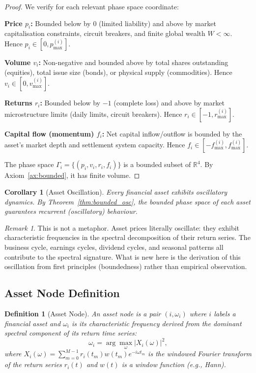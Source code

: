 \documentclass[twocolumn,10pt]{article}
\newtheorem{definition}[theorem]{Definition}
\newtheorem{corollary}[theorem]{Corollary}
\theoremstyle{remark}
\newtheorem{remark}[theorem]{Remark}
\newcommand{\thmref}[1]{Theorem~\ref{#1}}
\begin{document}
\begin{proof}
We verify for each relevant phase space coordinate:

\textbf{Price $p_i$:} Bounded below by $0$ (limited liability) and above by market capitalisation constraints, circuit breakers, and finite global wealth $W < \infty$.  Hence $p_i \in [0, p_{\max}^{(i)}]$.

\textbf{Volume $v_i$:} Non-negative and bounded above by total shares outstanding (equities), total issue size (bonds), or physical supply (commodities).  Hence $v_i \in [0, v_{\max}^{(i)}]$.

\textbf{Returns $r_i$:}  Bounded below by $-1$ (complete loss) and above by market microstructure limits (daily limits, circuit breakers).  Hence $r_i \in [-1, r_{\max}^{(i)}]$.

\textbf{Capital flow (momentum) $f_i$:}  Net capital inflow/outflow is bounded by the asset's market depth and settlement system capacity.  Hence $f_i \in [-f_{\max}^{(i)}, f_{\max}^{(i)}]$.

The phase space $\Gamma_i = \{(p_i, v_i, r_i, f_i)\}$ is a bounded subset of $\mathbb{R}^4$.  By Axiom~\ref{ax:bounded}, it has finite volume.
\end{proof}

\begin{corollary}[Asset Oscillation]
\label{cor:asset_osc}
Every financial asset exhibits oscillatory dynamics.  By \thmref{thm:bounded_osc}, the bounded phase space of each asset guarantees recurrent (oscillatory) behaviour.
\end{corollary}

\begin{remark}
This is not a metaphor.  Asset prices literally oscillate: they exhibit characteristic frequencies in the spectral decomposition of their return series.  The business cycle, earnings cycles, dividend cycles, and seasonal patterns all contribute to the spectral signature.  What is new here is the derivation of this oscillation from first principles (boundedness) rather than empirical observation.
\end{remark}

\subsection{Asset Node Definition}

\begin{definition}[Asset Node]
\label{def:asset_node}
An \emph{asset node} is a pair $(i, \omega_i)$ where $i$ labels a financial asset and $\omega_i$ is its characteristic frequency derived from the dominant spectral component of its return time series:
\begin{equation}
    \omega_i = \arg\max_{\omega} |X_i(\omega)|^2,
    \label{eq:char_freq_asset}
\end{equation}
where $X_i(\omega) = \sum_{m=0}^{M-1} r_i(t_m) w(t_m) e^{-i\omega t_m}$ is the windowed Fourier transform of the return series $r_i(t)$ and $w(t)$ is a window function (e.g., Hann).
\end{definition}
\end{document}
